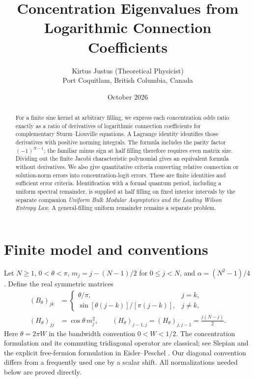 \documentclass[10pt]{article}
\title{Concentration Eigenvalues from Logarithmic Connection Coefficients}
\author{Kirtus Justus (Theoretical Physicist)\\
\small Port Coquitlam, British Columbia, Canada}
\date{October 2026}
\begin{document}
\maketitle
\begin{abstract}
For a finite sine kernel at arbitrary filling, we express each concentration
odds ratio exactly as a ratio of derivatives of logarithmic connection
coefficients for complementary Sturm--Liouville equations. A Lagrange
identity identifies those derivatives with positive norming integrals.
The formula includes the parity factor $(-1)^{N-1}$; the familiar minus sign
at half filling therefore requires even matrix size. Dividing out the finite
Jacobi characteristic polynomial gives an equivalent formula without
derivatives. We also give quantitative criteria converting relative
connection or solution-norm errors into concentration-logit errors.
These are finite identities and sufficient error criteria. Identification
with a formal quantum period, including a uniform spectral remainder,
is supplied at half filling on fixed interior intervals by the separate companion \emph{Uniform Bulk Modular Asymptotics and the Leading Wilson Entropy Law}. A general-filling uniform remainder remains a separate problem.
\end{abstract}

\section{Finite model and conventions}
Let $N\ge1$, $0<\theta<\pi$, $m_j=j-(N-1)/2$ for $0\le j<N$,
and $\alpha=(N^2-1)/4$. Define the real symmetric matrices
\begin{align}
(B_\theta)_{jk}&=
\begin{cases}
\theta/\pi,&j=k,\\
\sin[\theta(j-k)]/[\pi(j-k)],&j\ne k,
\end{cases} \label{eq:B}\\
(H_\theta)_{jj}&=\cos\theta\,m_j^2,\qquad
(H_\theta)_{j-1,j}=(H_\theta)_{j,j-1}=\frac{j(N-j)}2.
\label{eq:H}
\end{align}
Here $\theta=2\pi W$ in the bandwidth convention $0<W<1/2$.
The concentration formulation and its commuting tridiagonal operator are
classical; see Slepian \cite{slepian} and the explicit free-fermion formulation
in Eisler--Peschel \cite{eisler}. Our diagonal convention differs from a
frequently used one by a scalar shift. All normalizations needed below
are proved directly.
\end{document}
